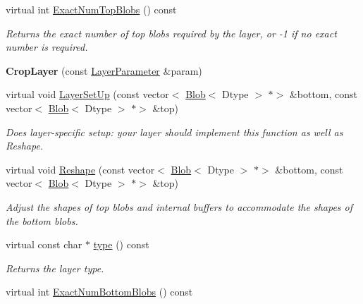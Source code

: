 \begin{DoxyCompactItemize}
virtual int \mbox{\hyperlink{classcaffe_1_1_crop_layer_a7e4a9aa634577308bc189adcf0ac22ed}{Exact\+Num\+Top\+Blobs}} () const
\begin{DoxyCompactList}\small\item\em Returns the exact number of top blobs required by the layer, or -\/1 if no exact number is required. \end{DoxyCompactList}\item 
\mbox{\label{classcaffe_1_1_crop_layer_a4baa861ad4fc049250b41111cb9588c2}} 
{\bfseries Crop\+Layer} (const \mbox{\hyperlink{classcaffe_1_1_layer_parameter}{Layer\+Parameter}} \&param)
\item 
virtual void \mbox{\hyperlink{classcaffe_1_1_crop_layer_ad4858525eae95a2526b11e20f46d6c3f}{Layer\+Set\+Up}} (const vector$<$ \mbox{\hyperlink{classcaffe_1_1_blob}{Blob}}$<$ Dtype $>$ $\ast$$>$ \&bottom, const vector$<$ \mbox{\hyperlink{classcaffe_1_1_blob}{Blob}}$<$ Dtype $>$ $\ast$$>$ \&top)
\begin{DoxyCompactList}\small\item\em Does layer-\/specific setup\+: your layer should implement this function as well as Reshape. \end{DoxyCompactList}\item 
virtual void \mbox{\hyperlink{classcaffe_1_1_crop_layer_a71fca33b7fb554973d6e7cc39affd8da}{Reshape}} (const vector$<$ \mbox{\hyperlink{classcaffe_1_1_blob}{Blob}}$<$ Dtype $>$ $\ast$$>$ \&bottom, const vector$<$ \mbox{\hyperlink{classcaffe_1_1_blob}{Blob}}$<$ Dtype $>$ $\ast$$>$ \&top)
\begin{DoxyCompactList}\small\item\em Adjust the shapes of top blobs and internal buffers to accommodate the shapes of the bottom blobs. \end{DoxyCompactList}\item 
\mbox{\label{classcaffe_1_1_crop_layer_af2261efb4a0861a1db4f8620fe4914de}} 
virtual const char $\ast$ \mbox{\hyperlink{classcaffe_1_1_crop_layer_af2261efb4a0861a1db4f8620fe4914de}{type}} () const
\begin{DoxyCompactList}\small\item\em Returns the layer type. \end{DoxyCompactList}\item 
virtual int \mbox{\hyperlink{classcaffe_1_1_crop_layer_ac6386917437ef54003bb7f8c2618f5fe}{Exact\+Num\+Bottom\+Blobs}} () const

\end{DoxyCompactItemize}
